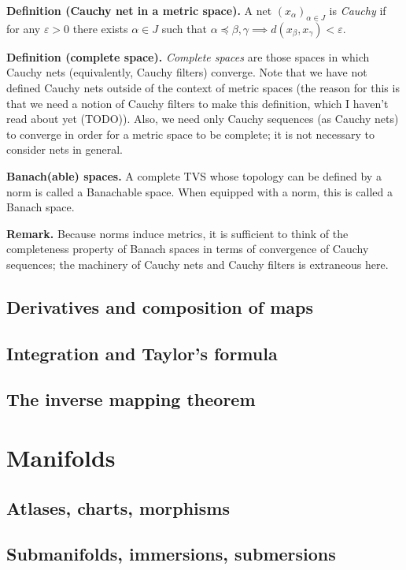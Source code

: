\documentclass[a4paper]{article}
\begin{document}
\textbf{Definition (Cauchy net in a metric space).} A net $(x_\alpha)_{\alpha \in J}$ is \emph{Cauchy} if for any $\varepsilon > 0$ there exists $\alpha \in J$ such that $\alpha \preceq \beta, \gamma \implies d(x_\beta, x_\gamma) < \varepsilon$.

\textbf{Definition (complete space).} \emph{Complete spaces} are those spaces in which Cauchy nets (equivalently, Cauchy filters) converge. Note that we have not defined Cauchy nets outside of the context of metric spaces (the reason for this is that we need a notion of Cauchy filters to make this definition, which I haven't read about yet (TODO)). Also, we need only Cauchy sequences (as Cauchy nets) to converge in order for a metric space to be complete; it is not necessary to consider nets in general.

\textbf{Banach(able) spaces.} A complete TVS whose topology can be defined by a norm is called a Banachable space. When equipped with a norm, this is called a Banach space.

\textbf{Remark.} Because norms induce metrics, it is sufficient to think of the completeness property of Banach spaces in terms of convergence of Cauchy sequences; the machinery of Cauchy nets and Cauchy filters is extraneous here.

\subsection{Derivatives and composition of maps}

\subsection{Integration and Taylor's formula}

\subsection{The inverse mapping theorem}

\section{Manifolds}

\subsection{Atlases, charts, morphisms}

\subsection{Submanifolds, immersions, submersions}
\end{document}
